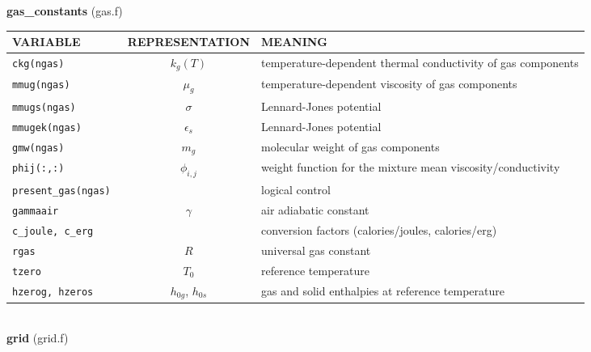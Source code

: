 %
{\large {\bf gas\_constants}} (gas.f)\\[5mm]
\begin{tabular}{|p{6cm}|c|p{6cm}|}\hline
VARIABLE & REPRESENTATION & MEANING\\\hline
\tt  ckg(ngas)    & $k_g(T)$ & temperature-dependent thermal conductivity of gas components\\\hline
\tt  mmug(ngas)   & $\mu_g$  & temperature-dependent viscosity of gas components\\\hline
\tt  mmugs(ngas)  & $\sigma$ & Lennard-Jones potential\\\hline
\tt  mmugek(ngas) & $\epsilon_s$ & Lennard-Jones potential\\\hline
\tt  gmw(ngas)    & $m_g$    & molecular weight of gas components\\\hline
\tt  phij(:,:)    & $\phi_{i,j}$ & weight function for the mixture mean viscosity/conductivity\\\hline
\tt  present\_gas(ngas)  & & logical control  \\\hline
\tt  gammaair         & $\gamma$ & air adiabatic constant \\\hline
\tt  c\_joule, c\_erg & & conversion factors (calories/joules, calories/erg) \\\hline
\tt  rgas             & $R$ & universal gas constant \\\hline
\tt  tzero            & $T_0$ & reference temperature \\\hline
\tt  hzerog, hzeros   &$h_{0g}$, $h_{0s}$& gas and solid enthalpies at reference temperature \\\hline
\end{tabular}\\[5mm]
%
%
{\large{\bf grid}} (grid.f)\\[5mm]

